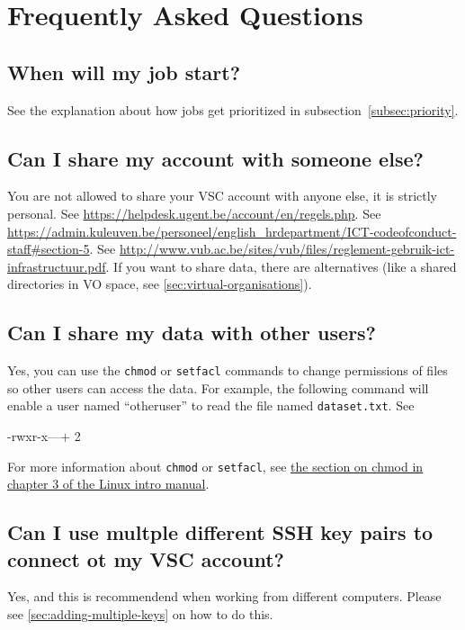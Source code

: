 \chapter{Frequently Asked Questions}
\label{ch:faq}

\ifgent
\section{When will my job start?}

See the explanation about how jobs get prioritized in subsection~\ref{subsec:priority}.

\fi
\section{Can I share my account with someone else?}

 You are not allowed to share your VSC account with anyone else, it is strictly personal.
\ifgent
See \url{https://helpdesk.ugent.be/account/en/regels.php}.
\fi
\ifleuven
See \url{https://admin.kuleuven.be/personeel/english_hrdepartment/ICT-codeofconduct-staff#section-5}.
\fi
\ifbrussel
See \url{http://www.vub.ac.be/sites/vub/files/reglement-gebruik-ict-infrastructuur.pdf}.
\fi
\ifgent
If you want to share data, there are alternatives (like a shared
directories in VO space, see \autoref{sec:virtual-organisations}).
\fi

\section{Can I share my data with other \hpc users?}

Yes, you can use the \verb|chmod| or \verb|setfacl| commands to change permissions
of files so other users can access the data. For example, the following command
will enable a user named ``otheruser'' to read the file named \verb|dataset.txt|.
See

\begin{prompt}
-rwxr-x---+ 2 %
\end{prompt}

For more information about \verb|chmod| or \verb|setfacl|, see \href{\LinuxManualURL#sec:chmod}
{the section on chmod in chapter 3 of the Linux intro manual}.

\section{Can I use multple different SSH key pairs to connect ot my VSC account?}

Yes, and this is recommendend when working from different computers. Please see
\autoref{sec:adding-multiple-keys} on how to do this.
